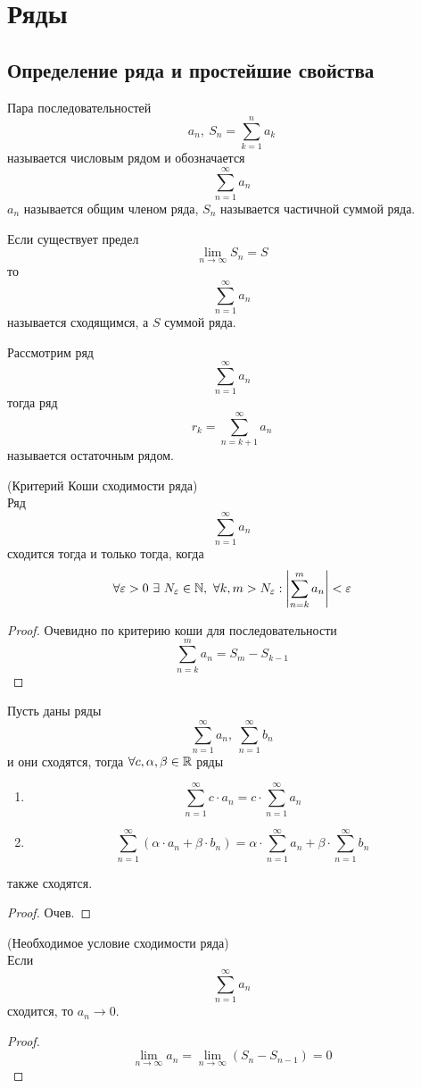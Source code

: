 \section{Ряды}
\subsection{Определение ряда и простейшие свойства}
\begin{definition}
    Пара последовательностей
    \[a_n,\ S_n=\sum_{k=1}^{n}a_k\]
    называется числовым рядом и обозначается
    \[\sum_{n=1}^{\infty}a_n\]
    $a_n$ называется общим членом ряда, $S_n$ называется частичной суммой ряда.
\end{definition}
\begin{definition}
    Если существует предел
    \[\lim\limits_{n\to \infty}S_n=S\]
    то 
    \[\sum_{n=1}^{\infty}a_n\]
    называется сходящимся, а $S$ суммой ряда.
\end{definition}
\begin{definition}
    Рассмотрим ряд
    \[\sum_{n=1}^{\infty}a_n\]
    тогда ряд 
    \[r_k=\sum_{n=k+1}^{\infty}a_n\]
    называется остаточным рядом.
\end{definition}
\begin{theorem}(Критерий Коши сходимости ряда)\\
    Ряд
    \[\sum_{n=1}^{\infty}a_n\]
    сходится тогда и только тогда, когда
    \[\forall \varepsilon>0\ \exists\ N_{\varepsilon}\in \mathbb{N},\ \forall k,m>N_{\varepsilon}: \left|\sum_{n=k}^{m}a_n\right|<\varepsilon\]
\end{theorem}
\begin{proof}
    Очевидно по критерию коши для последовательности
    \[\sum_{n=k}^{m}a_n=S_m-S_{k-1}\]
\end{proof}
\begin{theorem}
    Пусть даны ряды
    \[\sum_{n=1}^{\infty}a_n,\ \sum_{n=1}^{\infty}b_n\]
    и они сходятся, тогда $\forall c, \alpha, \beta\in \mathbb{R}$ ряды
    \begin{enumerate}
        \item
        \[\sum_{n=1}^{\infty}c\cdot a_n=c\cdot \sum_{n=1}^{\infty}a_n\]
        \item 
        \[\sum_{n=1}^{\infty}(\alpha\cdot a_n+\beta\cdot b_n)=\alpha\cdot \sum_{n=1}^{\infty}a_n+\beta\cdot \sum_{n=1}^{\infty}b_n\]
    \end{enumerate}
    также сходятся.
\end{theorem}
\begin{proof}
    Очев.
\end{proof}
\begin{theorem} (Необходимое условие сходимости ряда)\\
    Если
    \[\sum_{n=1}^{\infty}a_n\]
    сходится, то $a_n\to 0$.
\end{theorem}
\begin{proof}
    \[\lim\limits_{n\to\infty}a_n=\lim\limits_{n\to\infty}(S_n-S_{n-1})=0\]
\end{proof}
